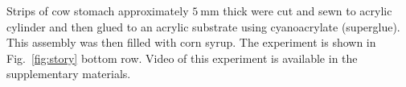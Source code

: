 Strips of cow stomach approximately $\SI{5}{\milli\metre}$ thick were cut and sewn to acrylic cylinder and then glued to an acrylic substrate using cyanoacrylate (superglue). This assembly was then filled with corn syrup. The experiment is shown in Fig.~\ref{fig:story} bottom row. Video of this experiment is available in the supplementary materials.



